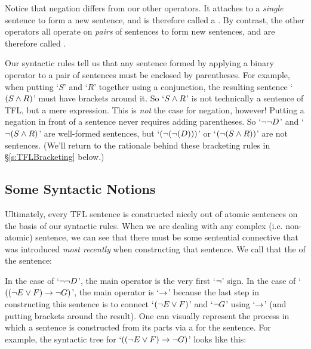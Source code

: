 Notice that negation differs from our other operators.  It attaches to a \emph{single} sentence to form a new sentence, and is therefore called a .  By contrast, the other operators all operate on \emph{pairs} of sentences to form new sentences, and are therefore called .  

Our syntactic rules tell us that any sentence formed by applying a binary operator to a pair of sentences must be enclosed by parentheses.  For example, when putting `$S$' and `$R$' together using a conjunction, the resulting sentence `$(S \wedge R)$' must have brackets around it.  So `$S \wedge R$' is not technically a sentence of TFL, but a mere expression.  This is \emph{not} the case for negation, however!  Putting a negation in front of a sentence never requires adding parentheses.  So `$\neg \neg D$' and `$\neg (S \wedge R)$' are well-formed sentences, but `$(\neg (\neg (D)))$' or `$(\neg (S \wedge R))$' are not sentences.  (We'll return to the rationale behind these bracketing rules in \S \ref{s:TFLBracketing} below.)

\subsection{Some Syntactic Notions}\label{s:TFLSyntacticNotions}



Ultimately, every TFL sentence is constructed nicely out of atomic sentences on the basis of our syntactic rules. When we are dealing with any complex (i.e. non-atomic) sentence, we can see that there must be some sentential connective that was introduced \emph{most recently} when constructing that sentence. We call that the  of the sentence: 


In the case of `$\neg\neg D$', the main operator is the very first `$\neg$' sign. In the case of `$((\neg E \vee F) \rightarrow \neg G)$', the main operator is `$\rightarrow$' because the last step in constructing this sentence is to connect `$(\neg E \vee F)$' and `$\neg G$' using `$\rightarrow$' (and putting brackets around the result).  One can visually represent the process in which a sentence is constructed from its parts via  a  for the sentence.  For example, the syntactic tree for `$((\neg E \vee F) \rightarrow \neg G)$' looks like this:\\


